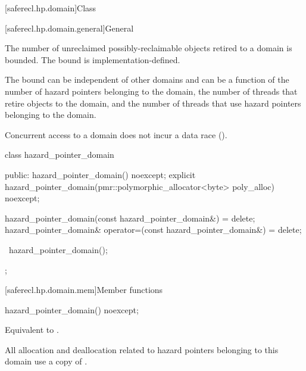 [saferecl.hp.domain]{Class }

[saferecl.hp.domain.general]{General}

\pnum
The number of unreclaimed possibly-reclaimable objects retired to a domain is bounded.
The bound is implementation-defined. \begin{note} The bound can be independent of other
domains and can be a function of the number of hazard pointers belonging to the
domain, the number of threads that retire objects to the domain, and the number of
threads that use hazard pointers belonging to the domain. \end{note}

\pnum
Concurrent access to a domain does not incur a data race ().

\begin{codeblock}
class hazard_pointer_domain {
public:
  hazard_pointer_domain() noexcept;
  explicit hazard_pointer_domain(pmr::polymorphic_allocator<byte> poly_alloc) noexcept;

  hazard_pointer_domain(const hazard_pointer_domain&) = delete;
  hazard_pointer_domain& operator=(const hazard_pointer_domain&) = delete;

  ~hazard_pointer_domain();
};
\end{codeblock}

[saferecl.hp.domain.mem]{Member functions}

\begin{itemdecl}
hazard_pointer_domain() noexcept;
\end{itemdecl}

\begin{itemdescr}

\pnum
\effects 
Equivalent to .

\end{itemdescr}

\begin{itemdecl}
explicit hazard_pointer_domain(pmr::polymorphic_allocator<byte> poly_alloc) noexcept;}
\end{itemdecl}

\begin{itemdescr}

\pnum
\remarks 
All allocation and deallocation related to hazard pointers belonging to this
domain use a copy of .

\end{itemdescr}

